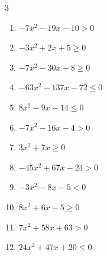 \begin{multicols}{3}
\begin{enumerate}

  \item $-7x^{2}-19x-10>0$


  \item $-3x^{2}+2x+5\geq 0$


  \item $-7x^{2}-30x-8\geq 0$


\columnbreak %

  \item $-63x^{2}-137x-72\leq 0$


  \item $8x^{2}-9x-14\leq 0$


  \item $-7x^{2}-16x-4>0$


  \item $3x^{2}+7x\geq 0$


  \item $-45x^{2}+67x-24>0$


  \item $-3x^{2}-8x-5<0$


  \item $8x^{2}+6x-5\geq 0$


  \item $7x^{2}+58x+63>0$


  \item $24x^{2}+47x+20\leq 0$


\end{enumerate}
\end{multicols}
